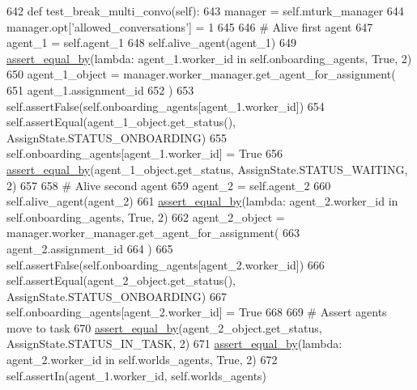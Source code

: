 \begin{DoxyCode}
642     \textcolor{keyword}{def }test\_break\_multi\_convo(self):
643         manager = self.mturk\_manager
644         manager.opt[\textcolor{stringliteral}{'allowed\_conversations'}] = 1
645 
646         \textcolor{comment}{# Alive first agent}
647         agent\_1 = self.agent\_1
648         self.alive\_agent(agent\_1)
649         \hyperlink{namespaceparlai_1_1mturk_1_1core_1_1test_1_1test__full__system_a0b463246d35658a2e422010f13dcf819}{assert\_equal\_by}(\textcolor{keyword}{lambda}: agent\_1.worker\_id \textcolor{keywordflow}{in} self.onboarding\_agents, \textcolor{keyword}{True}, 2)
650         agent\_1\_object = manager.worker\_manager.get\_agent\_for\_assignment(
651             agent\_1.assignment\_id
652         )
653         self.assertFalse(self.onboarding\_agents[agent\_1.worker\_id])
654         self.assertEqual(agent\_1\_object.get\_status(), AssignState.STATUS\_ONBOARDING)
655         self.onboarding\_agents[agent\_1.worker\_id] = \textcolor{keyword}{True}
656         \hyperlink{namespaceparlai_1_1mturk_1_1core_1_1test_1_1test__full__system_a0b463246d35658a2e422010f13dcf819}{assert\_equal\_by}(agent\_1\_object.get\_status, AssignState.STATUS\_WAITING, 2)
657 
658         \textcolor{comment}{# Alive second agent}
659         agent\_2 = self.agent\_2
660         self.alive\_agent(agent\_2)
661         \hyperlink{namespaceparlai_1_1mturk_1_1core_1_1test_1_1test__full__system_a0b463246d35658a2e422010f13dcf819}{assert\_equal\_by}(\textcolor{keyword}{lambda}: agent\_2.worker\_id \textcolor{keywordflow}{in} self.onboarding\_agents, \textcolor{keyword}{True}, 2)
662         agent\_2\_object = manager.worker\_manager.get\_agent\_for\_assignment(
663             agent\_2.assignment\_id
664         )
665         self.assertFalse(self.onboarding\_agents[agent\_2.worker\_id])
666         self.assertEqual(agent\_2\_object.get\_status(), AssignState.STATUS\_ONBOARDING)
667         self.onboarding\_agents[agent\_2.worker\_id] = \textcolor{keyword}{True}
668 
669         \textcolor{comment}{# Assert agents move to task}
670         \hyperlink{namespaceparlai_1_1mturk_1_1core_1_1test_1_1test__full__system_a0b463246d35658a2e422010f13dcf819}{assert\_equal\_by}(agent\_2\_object.get\_status, AssignState.STATUS\_IN\_TASK, 2)
671         \hyperlink{namespaceparlai_1_1mturk_1_1core_1_1test_1_1test__full__system_a0b463246d35658a2e422010f13dcf819}{assert\_equal\_by}(\textcolor{keyword}{lambda}: agent\_2.worker\_id \textcolor{keywordflow}{in} self.worlds\_agents, \textcolor{keyword}{True}, 2)
672         self.assertIn(agent\_1.worker\_id, self.worlds\_agents)

\end{DoxyCode}
